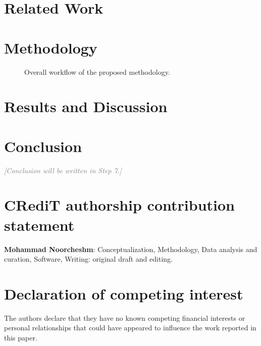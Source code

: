 \documentclass[3p, authoryear]{elsarticle}
\begin{document}
\section{Related Work}\label{sec:related_work}


\section{Methodology}\label{sec:methodology}


\begin{figure}[tp]
  \centering
  
  \caption{Overall workflow of the proposed methodology.}
  \label{fig:flowchart}
\end{figure}

\section{Results and Discussion}\label{sec:results}


\section{Conclusion}\label{sec:conclusion}
\textcolor{gray}{\textit{[Conclusion will be written in Step 7.]}}

\section*{CRediT authorship contribution statement}
\textbf{Mohammad Noorcheshm}: Conceptualization, Methodology, Data analysis
and curation, Software, Writing: original draft and editing.

\section*{Declaration of competing interest}
The authors declare that they have no known competing financial interests or
personal relationships that could have appeared to influence the work reported
in this paper.
\end{document}
